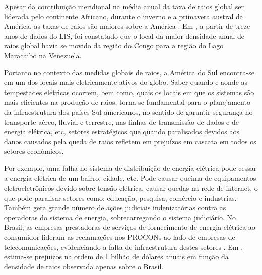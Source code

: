 Apesar da contribuição meridional na média anual da taxa de raios global ser liderada pelo continente Africano, durante o inverno e a primavera austral da América, as taxas de raios são maiores sobre a América \cite{christian2003global}. Em , a partir de treze anos de dados do LIS, foi constatado que o local da maior densidade anual de raios global havia se movido da região do Congo para a região do Lago Maracaibo na Venezuela.

Portanto no contexto das medidas globais de raios, a América do Sul encontra-se em um dos locais mais eletricamente ativos do globo. Saber quando e aonde as tempestades elétricas ocorrem, bem como, quais os locais em que os sistemas são mais eficientes na produção de raios, torna-se fundamental para o planejamento da infraestrutura dos países Sul-americanos, no sentido de garantir segurança no transporte aéreo, fluvial e terrestre, nas linhas de transmissão de dados e de energia elétrica, etc, setores estratégicos que quando paralisados devidos aos danos causados pela queda de raios refletem em prejuízos em cascata em todos os setores econômicos. 

Por exemplo, uma falha no sistema de distribuição de energia elétrica pode cessar a energia elétrica de um bairro, cidade, etc. Pode causar queima de equipamentos eletroeletrônicos devido sobre tensão elétrica, causar quedas na rede de internet, o que pode paralisar  setores como: educação, pesquisa, comércio e industrias. Também gera grande número de ações judiciais indenizatórias contra as operadoras do sistema de energia, sobrecarregando o sistema judiciário. No Brasil, as empresas prestadoras de serviços de fornecimento de energia elétrica ao consumidor lideram as reclamações nos PROCONs ao lado de empresas de telecomunicações, evidenciando a falta de infraestrutura destes setores \cite{noticiaG1tempestade, noticiaG1levantamento, noticiaFolha, noticiaFolhaRaio, rankinProcon}. Em , estima-se prejuízos na ordem de 1 bilhão de dólares anuais em função da densidade de raios observada apenas sobre o Brasil. 
      

